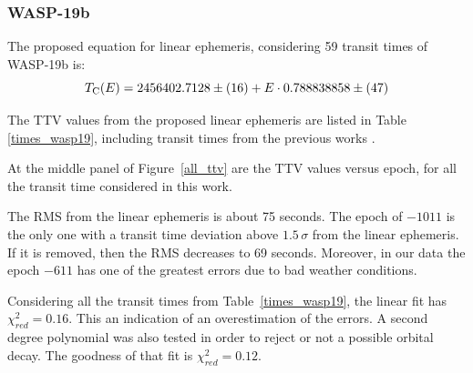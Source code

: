 \subsubsection{WASP-19b}

The proposed equation for linear ephemeris, considering 59 transit times of WASP-19b is:
\begin{equation} \label{eq1_w19}
T_{\rm C}(E)=2456402.7128\pm(16)+E \cdot 0.788838858\pm(47)
\end{equation}

The TTV values from the proposed linear ephemeris are listed in Table \ref{times_wasp19}, including transit times from the previous works \citep{Hebb2010,Anderson2010,Lendl2013,Tregloan2013,Bean2013,Mancini2013}. 

At the middle panel of Figure~\ref{all_ttv} are the TTV values versus epoch, for all the transit time considered in this work.

The RMS from the linear ephemeris is about 75 seconds. The epoch of $-1011$ is the only one with a transit time deviation above $1.5\,\sigma$ from the linear ephemeris. If it is removed, then the RMS decreases to 69 seconds. Moreover, in our data the epoch $-611$ has one of the greatest errors due to bad weather conditions.

Considering all the transit times from Table~\ref{times_wasp19}, the linear fit has $\chi^{2}_{red} = 0.16$. This an indication of an overestimation of the errors. A second degree polynomial was also tested in order to reject or not a possible orbital decay. The goodness of that fit is $\chi^{2}_{red}=0.12$. 

